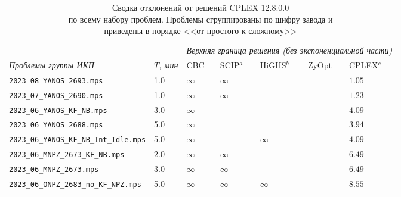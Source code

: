 \documentclass[%
	11pt,
	a4paper,
	utf8,
		]{article}
\begin{document}
\begin{landscape}
{%
	\begin{table}[!h]
		\centering
		\caption{Сводка отклонений от решений CPLEX 12.8.0.0\\ по всему набору проблем. Проблемы сгруппированы по шифру завода и \\приведены в порядке <<от простого к сложному>>}
		
		\begin{tabular}{ p{} | p{1.4cm} | p{0.7cm} | p{2.3cm} | p{2.5cm} | p{2.7cm} | p{1.4cm} }
			{} & {} & \multicolumn{5}{c}{\emph{Верхняя граница решения (без экспоненциальной части)}}\\[2mm]
			\emph{Проблемы группы ИКП} & $ T $\emph{, мин} & CBC & SCIP$^a $ & HiGHS$ ^b $ & ZyOpt & CPLEX$ ^c $ \\
			\hline\hline
			\rowcolor{blue!3}\texttt{2023\_08\_YANOS\_2693.mps} & 1.0 & $ \infty $ & $ \infty $ & \ccb{ $ 1.05 (-0.07\%) $ } & \ccb{ $ 1.05 (-0.10\%) $ } & $ 1.05 $ \\
			\rowcolor{black!5}\texttt{2023\_07\_YANOS\_2690.mps} & 1.0 & $ \infty $ & $ \infty $ & \ccb{$ 1.23 (-0.08\%) $} & \ccg{ $ 1.23 (+0.01\%) $ } & $ 1.23 $ \\
			\rowcolor{blue!3}\texttt{2023\_06\_YANOS\_KF\_NB.mps} & 3.0 & $ \infty $ & \ccb{$ 4.16 (-1.92\%) $} & \ccb{ $ 4.17 (-1.98\%) $ } & \ccb{ $ 4.13 (-1.22\%) $ } & $ 4.09 $ \\
			\rowcolor{black!5}\texttt{2023\_06\_YANOS\_2688.mps} & 5.0 & $ \infty $ & \ccb{ $ 3.96 (-0.47\%) $} & \ccb{ $ 3.96 (-0.56\%) $ } & \ccb{ $ 3.99 (-1.33\%) $ } & $ 3.94 $\\
			\rowcolor{blue!3}\texttt{2023\_06\_YANOS\_KF\_NB\_Int\_Idle.mps} & 5.0 & $ \infty $ & \ccb{ $ 4.17 (-1.92\%) $ } & $ \infty $ & \ccb{ $ 4.20 (-2.52\%) $ } & $ 4.09 $ \\
			\noalign{\smallskip} 
			\rowcolor{black!5}\texttt{2023\_06\_MNPZ\_2673\_KF\_NB.mps} & 2.0 & $ \infty $ & $ \infty $ & \ccb{ $ 6.66 (-2.71\%) $ } & \ccb{ $ 6.68 (-2.91\%) $ } & $ 6.49 $ \\
			\rowcolor{blue!3}\texttt{2023\_06\_MNPZ\_2673.mps} & 3.0 & $ \infty $ &  $ \infty $ & \ccb{ $ 6.53 (-0.58\%) $ } & \ccb{ $ 6.61 (-1.82\%) $ } & $ 6.49 $ \\
			\noalign{\smallskip} 
			\rowcolor{black!5}\texttt{2023\_06\_ONPZ\_2683\_no\_KF\_NPZ.mps} & 5.0 & $ \infty $ & $ \infty $ & $ \infty $ & \ccg{$ 7.67 (+10.35\%) $} & $ 8.55 $\\

\end{tabular}
\end{table}}
\end{landscape}
\end{document}
